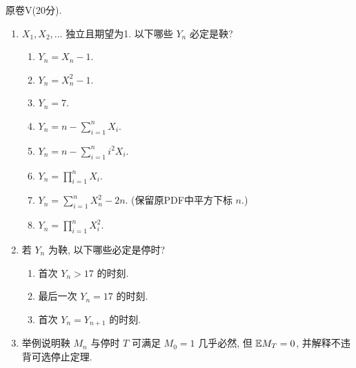 \begin{exercise}\label{ex:flp-V}
原卷V(20分).
\begin{enumerate}
\item $X_1,X_2,\ldots$ 独立且期望为1. 以下哪些 $Y_n$ 必定是鞅?
\begin{enumerate}[label=(\alph*)]
\item $Y_n=X_n-1$.
\item $Y_n=X_n^2-1$.
\item $Y_n=7$.
\item $Y_n=n-\sum_{i=1}^nX_i$.
\item $Y_n=n-\sum_{i=1}^ni^2X_i$.
\item $Y_n=\prod_{i=1}^nX_i$.
\item $Y_n=\sum_{i=1}^nX_n^2-2n$. (保留原PDF中平方下标 $n$.)
\item $Y_n=\prod_{i=1}^nX_i^2$.
\end{enumerate}
\item 若 $Y_n$ 为鞅, 以下哪些必定是停时?
\begin{enumerate}[label=(\alph*)]
\item 首次 $Y_n>17$ 的时刻.
\item 最后一次 $Y_n=17$ 的时刻.
\item 首次 $Y_n=Y_{n+1}$ 的时刻.
\end{enumerate}
\item 举例说明鞅 $M_n$ 与停时 $T$ 可满足 $M_0=1$ 几乎必然, 但 $\mathbb E M_T=0$, 并解释不违背可选停止定理.
\end{enumerate}
\end{exercise}
